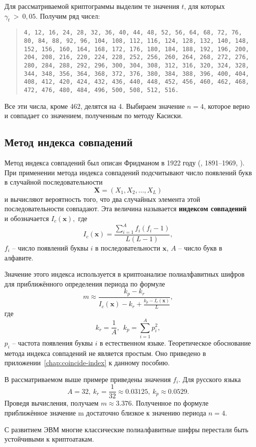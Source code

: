 \example
Для рассматриваемой криптограммы выделим те значения $t$, для которых $\gamma _t~>~0,05.$ Получим ряд чисел:

\begin{quote}
    \noindent \texttt{4, 12, 16, 24, 28, 32, 36, 40, 44, 48, 52, 56, 64, 68, 72, 76, 80, 84, 88, 92, 96, 104, 108, 112, 116, 124, 128, 132, 140, 148, 152, 156, 160, 164, 168, 172, 176, 180, 184, 188, 192, 196, 200, 204, 208, 216, 220, 224, 228, 252, 256, 260, 264, 268, 272, 276, 280, 284, 288, 292, 296, 300, 304, 308, 312, 316, 320, 324, 328, 344, 348, 356, 364, 368, 372, 376, 380, 384, 388, 396, 400, 404, 408, 412, 420, 424, 432, 436, 440, 448, 452, 456, 460, 462, 468, 472, 476, 480, 484, 496, 500, 508, 512, 516.}
\end{quote}

Все эти числа, кроме 462, делятся на 4. Выбираем значение $n=4$, которое верно и совпадает со значением, полученным по методу Касиски.
\exampleend


\subsection{Метод индекса совпадений}

Метод индекса совпадений был описан Фридманом в 1922 году (, 1891--1969, \cite{Friedman:1922}). При применении метода индекса совпадений подсчитывают число появлений букв в случайной последовательности
    \[ \mathbf{X} = (X_1 ,X_2 , \ldots , X_L ) \]
и вычисляют вероятность того, что два случайных элемента этой последовательности совпадают. Эта величина называется \textbf{индексом совпадений} и обозначается $I_{c}(\mathbf{x}),$ где
    \[ I_{c} (\mathbf{x}) = \frac{{\sum\limits_{i = 1}^A {f_i (f_i  - 1)} }} {{L(L - 1)}}, \]
$f_{i}$ -- число появлений буквы $i$ в последовательности $\mathbf{x}$, $A$ -- число букв в алфавите.

Значение этого индекса используется в криптоанализе полиалфавитных шифров для приближённого определения периода по формуле
    \[ m \approx \frac{{k_p  - k_r }} {{I_{c} (\mathbf{x}) - k_r  + \frac{{k_p  - I_{c} (\mathbf{x})}} {L}}}, \]
где
    \[ k_r  = \frac{1}{A}, ~~ k_p  = \sum\limits_{i=1}^A p_i^2, \]
$p_i $ -- частота появления буквы $i$ в естественном языке.
Теоретическое обоснование метода индекса совпадений не является простым. Оно приведено в приложении~\ref{chap:coincide-index} к данному пособию.

\example
В рассматриваемом выше примере приведены значения $f_{i}$. Для русского языка
    \[ A=32, ~ k_{r} = \frac{1}{32} \approx 0.03125, ~ k_{p} \approx 0.0529. \]
Проведя вычисления, получаем $m \approx 3.376$. Полученное по формуле приближённое значение m достаточно близкое к значению периода $n=4$.
\exampleend

С развитием ЭВМ многие классические полиалфавитные шифры перестали быть устойчивыми к криптоатакам.
